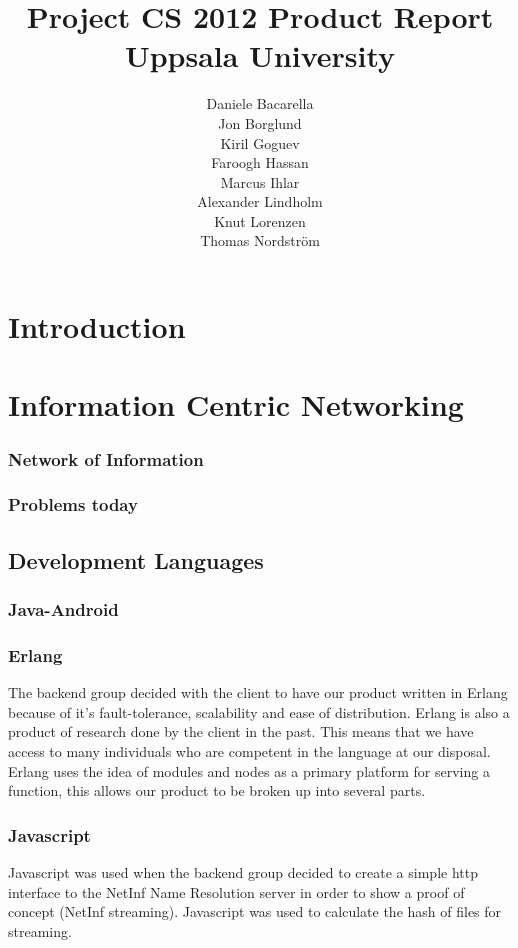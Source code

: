 \documentclass[11pt]{report}
\title{Project CS 2012 Product Report\\Uppsala University\\}
\author{Daniele Bacarella\\
Jon Borglund\\
Kiril Goguev\\
		Faroogh Hassan\\
		Marcus Ihlar\\
		Alexander Lindholm\\
		Knut Lorenzen\\
		Thomas Nordström\\
}
\date{}
\begin{document}
\maketitle

\tableofcontents

\chapter{Introduction}
\chapter{Information Centric Networking}

\subsection{Network of Information}
\subsection{Problems  today}
\section{Development Languages}
\subsection{Java-Android}
\subsection{Erlang}
The backend group decided with the client to have our product written in Erlang because of it's fault-tolerance, scalability and ease of distribution. Erlang is also a product of research done by the client in the past. This means that we have access to many individuals who are competent in the language at our disposal.
Erlang uses the idea of modules and nodes as a primary platform for serving a function, this allows our product to be broken up into several parts.
 
\subsection{Javascript}

Javascript was used when the backend group decided to create a simple http interface to the NetInf Name Resolution server in order to show a proof of concept (NetInf streaming). Javascript was used to calculate the hash of files for streaming.
\end{document}
